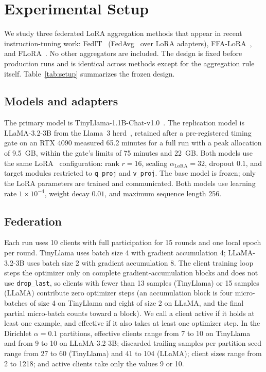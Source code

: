 \section{Experimental Setup}
\label{sec:setup}

We study three federated LoRA aggregation methods that appear in recent instruction-tuning work: FedIT~\cite{zhang2024fedit} (\mbox{FedAvg}~\cite{mcmahan2017fedavg} over LoRA adapters), FFA-LoRA~\cite{sun2024ffalora}, and FLoRA~\cite{wang2024flora}. No other aggregators are included. The design is fixed before production runs and is identical across methods except for the aggregation rule itself. Table~\ref{tab:setup} summarizes the frozen design.

\begin{table}[!t]
\centering
\caption{Frozen experimental design.}
\label{tab:setup}
\small

\end{table}

\subsection{Models and adapters}
The primary model is TinyLlama-1.1B-Chat-v1.0~\cite{zhang2024tinyllama}. The replication model is LLaMA-3.2-3B from the Llama~3 herd~\cite{grattafiori2024llama3}, retained after a pre-registered timing gate on an RTX 4090 measured 65.2 minutes for a full run with a peak allocation of 9.5~GB, within the gate's limits of 75 minutes and 22~GB. Both models use the same LoRA~\cite{hu2022lora} configuration: rank $r{=}16$, scaling $\alpha_{\mathrm{LoRA}}{=}32$, dropout $0.1$, and target modules restricted to \texttt{q\_proj} and \texttt{v\_proj}. The base model is frozen; only the LoRA parameters are trained and communicated. Both models use learning rate $1{\times}10^{-4}$, weight decay $0.01$, and maximum sequence length 256.

\subsection{Federation}
Each run uses 10 clients with full participation for 15 rounds and one local epoch per round. TinyLlama uses batch size 4 with gradient accumulation 4; LLaMA-3.2-3B uses batch size 2 with gradient accumulation 8. The client training loop steps the optimizer only on complete gradient-accumulation blocks and does not use \texttt{drop\_last}, so clients with fewer than 13 samples (TinyLlama) or 15 samples (LLaMA) contribute zero optimizer steps (an accumulation block is four micro-batches of size 4 on TinyLlama and eight of size 2 on LLaMA, and the final partial micro-batch counts toward a block).
We call a client active if it holds at least one example, and effective if it also
takes at least one optimizer step.
In the Dirichlet $\alpha{=}0.1$ partitions, effective clients range from 7 to 10 on TinyLlama and from 9 to 10 on LLaMA-3.2-3B; discarded trailing samples per partition seed range from 27 to 60 (TinyLlama) and 41 to 104 (LLaMA); client sizes range from 2 to 1218; and active clients take only the values 9 or 10.

